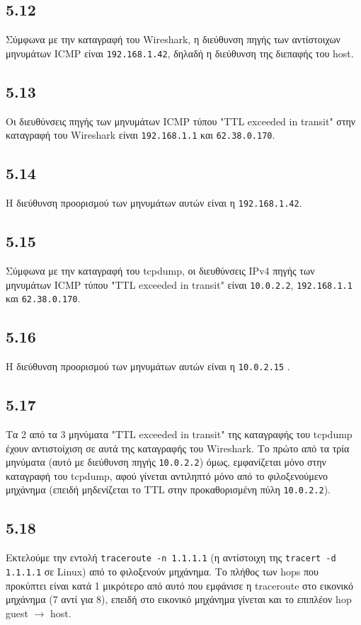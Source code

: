 \documentclass[a4paper, 12pt]{article}
\begin{document}
	\subsection*{5.12}
		Σύμφωνα με την καταγραφή του Wireshark, η διεύθυνση πηγής των αντίστοιχων μηνυμάτων ICMP είναι \verb|192.168.1.42|, δηλαδή η διεύθυνση της διεπαφής του host.

	\subsection*{5.13}
		Οι διευθύνσεις πηγής των μηνυμάτων ICMP τύπου "TTL exceeded in transit" στην καταγραφή του Wireshark είναι \verb|192.168.1.1| και \verb|62.38.0.170|. 

	\subsection*{5.14}
		Η διεύθυνση προορισμού των μηνυμάτων αυτών είναι η \verb|192.168.1.42|.

	\subsection*{5.15}
		Σύμφωνα με την καταγραφή του tcpdump, οι διευθύνσεις IPv4 πηγής των μηνυμάτων ICMP τύπου "TTL exceeded in transit" είναι \verb|10.0.2.2|, \verb|192.168.1.1| και \verb|62.38.0.170|.

	\subsection*{5.16}
		Η διεύθυνση προορισμού των μηνυμάτων αυτών είναι η \verb|10.0.2.15| .

	\subsection*{5.17}
		Τα 2 από τα 3 μηνύματα "TTL exceeded in transit" της καταγραφής του tcpdump έχουν αντιστοίχιση σε αυτά της καταγραφής του Wireshark. Το πρώτο από τα τρία μηνύματα (αυτό με διεύθυνση πηγής \verb|10.0.2.2|) όμως, εμφανίζεται μόνο στην καταγραφή του tcpdump, αφού γίνεται αντιληπτό μόνο από το φιλοξενούμενο μηχάνημα (επειδή μηδενίζεται το TTL στην προκαθορισμένη πύλη \verb|10.0.2.2|).

	\subsection*{5.18}
		Εκτελούμε την εντολή \verb|traceroute -n 1.1.1.1| (η αντίστοιχη της \verb|tracert -d 1.1.1.1| σε Linux) από το φιλοξενούν μηχάνημα. Το πλήθος των hops που προκύπτει είναι κατά 1 μικρότερο από αυτό που εμφάνισε η traceroute στο εικονικό μηχάνημα (7 αντί για 8), επειδή στο εικονικό μηχάνημα γίνεται και το επιπλέον hop guest $\rightarrow$ host.
		
\end{document}
